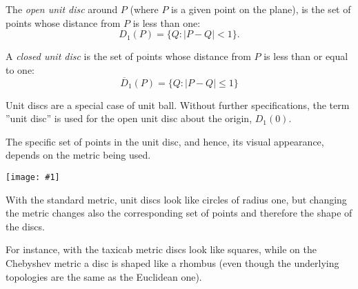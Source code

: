 \documentclass[12pt]{article}
\newcommand{\figuraex}[2]{\begin{center}\texttt{[image: \#1]}\end{center}}
\begin{document}
The \emph{open  unit disc} around $P$ (where $P$ is a given point on the plane), is the set of points whose distance from $P$ is less than one:
\[D_1(P) = \{ Q : \vert P-Q\vert<1\}.\]

A \emph{closed unit  disc} is the set of points whose distance from $P$ is less than or equal to one:
\[\overline D_1(P)=\{Q:|P-Q| \leq 1\}\]

Unit discs are a special case of unit ball. Without further specifications, the term ''unit disc'' is used for the open unit disc about the origin, $D_1(0)$.

The specific set of points in the unit disc, and hence, its visual appearance, depends on the metric being used.
\figuraex{unitdisc}{scale=0.75}

With the standard metric, unit discs look like circles of radius one, but changing the metric changes also the corresponding set of points and therefore the shape of the discs.  	 
 		 
For instance, with the taxicab metric discs look like squares, while on the Chebyshev metric a disc is shaped like a rhombus (even though the underlying topologies are the same as the Euclidean one).
\end{document}
